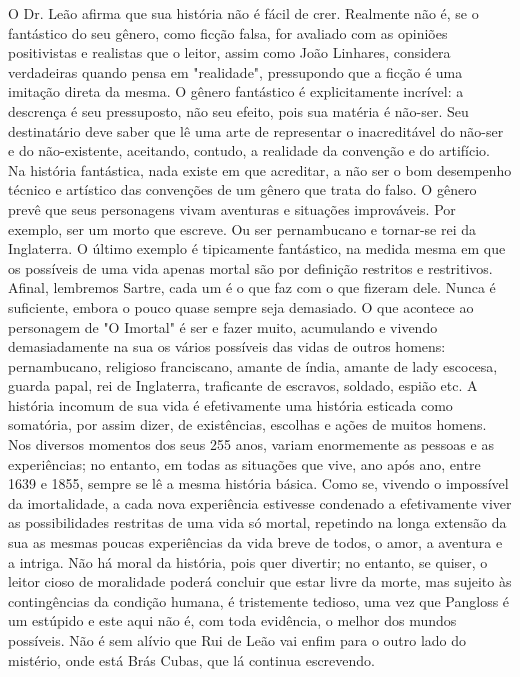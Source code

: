 O Dr. Leão afirma que sua história não é fácil de crer. Realmente não é,
se o fantástico do seu gênero, como ficção falsa, for avaliado com as
opiniões positivistas e realistas que o leitor, assim como João
Linhares, considera verdadeiras quando pensa em "realidade", pressupondo
que a ficção é uma imitação direta da mesma. O gênero fantástico é
explicitamente incrível: a descrença é seu pressuposto, não seu efeito,
pois sua matéria é não-ser. Seu destinatário deve saber que lê uma arte
de representar o inacreditável do não-ser e do não-existente, aceitando,
contudo, a realidade da convenção e do artifício. Na história
fantástica, nada existe em que acreditar, a não ser o bom desempenho
técnico e artístico das convenções de um gênero que trata do falso. O
gênero prevê que seus personagens vivam aventuras e situações
improváveis. Por exemplo, ser um morto que escreve. Ou ser pernambucano
e tornar-se rei da Inglaterra. O último exemplo é tipicamente
fantástico, na medida mesma em que os possíveis de uma vida apenas
mortal são por definição restritos e restritivos. Afinal, lembremos
Sartre, cada um é o que faz com o que fizeram dele. Nunca é suficiente,
embora o pouco quase sempre seja demasiado. O que acontece ao personagem
de "O Imortal" é ser e fazer muito, acumulando e vivendo demasiadamente
na sua os vários possíveis das vidas de outros homens: pernambucano,
religioso franciscano, amante de índia, amante de lady escocesa, guarda
papal, rei de Inglaterra, traficante de escravos, soldado, espião etc. A
história incomum de sua vida é efetivamente uma história esticada como
somatória, por assim dizer, de existências, escolhas e ações de muitos
homens. Nos diversos momentos dos seus 255 anos, variam enormemente as
pessoas e as experiências; no entanto, em todas as situações que vive,
ano após ano, entre 1639 e 1855, sempre se lê a mesma história básica.
Como se, vivendo o impossível da imortalidade, a cada nova experiência
estivesse condenado a efetivamente viver as possibilidades restritas de
uma vida só mortal, repetindo na longa extensão da sua as mesmas poucas
experiências da vida breve de todos, o amor, a aventura e a intriga. Não
há moral da história, pois quer divertir; no entanto, se quiser, o
leitor cioso de moralidade poderá concluir que estar livre da morte, mas
sujeito às contingências da condição humana, é tristemente tedioso, uma
vez que Pangloss é um estúpido e este aqui não é, com toda evidência, o
melhor dos mundos possíveis. Não é sem alívio que Rui de Leão vai enfim
para o outro lado do mistério, onde está Brás Cubas, que lá continua
escrevendo.

